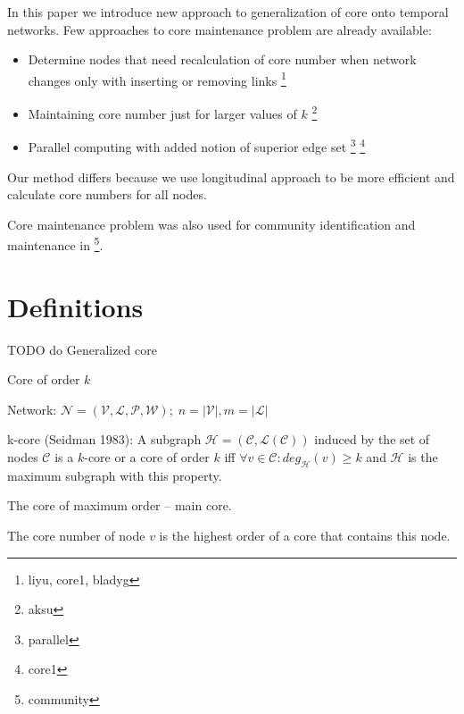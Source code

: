 \documentclass[a4paper,twoside,10pt]{article}
\newcommand{\C}{\mathcal{C}}
\begin{document}
In this paper we introduce new approach to generalization of core onto temporal networks. 
Few approaches to core maintenance problem are already available:
\begin{itemize}
\item Determine nodes that need recalculation of core number when network changes only with inserting or removing links \footnote{liyu, core1, bladyg}
\item Maintaining core number just for larger values of $k$ \footnote{aksu}
\item Parallel computing with added notion of superior edge set \footnote{parallel}
\footnote{core1}
\end{itemize}

Our method differs because we use longitudinal approach to be more efficient and calculate core numbers for all nodes.

Core maintenance problem was also used for community identification and maintenance in \footnote{community}.



%
%
\section{Definitions}\label{definitions}
TODO do Generalized core

Core of order $k$

Network: 
$
\mathcal{N} = (\mathcal{V}, \mathcal{L}, \mathcal{P}, \mathcal{W}); \; n = |\mathcal{V}|, m = |\mathcal{L}|$

k-core (Seidman 1983): 
A subgraph $\mathcal{H} = (\C,\mathcal{L}(\C))$ induced by the
set of nodes $\C$ is a $k$-core or a core of order $k$ iff $\forall v \in \C : deg_\mathcal{H}(v) \geq k$ and $\mathcal{H}$ is the maximum
subgraph with this property.


The core of maximum order -- main core.

The core number of node $v$ is the highest order of a core that contains this node.
\end{document}
